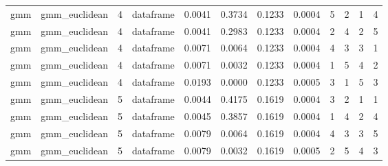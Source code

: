 {\begin{longtable}{| p{1cm} | p{1.8cm} | p{0.7cm} | p{0.9cm} | p{0.5cm} | p{0.65cm} | p{0.5cm} | p{0.5cm} | p{0.55cm} | p{0.55cm} | p{0.6cm} | p{0.5cm} |}
\cline{3-12}
\scriptsize     gmm   & \scriptsize   gmm\_euclidean & \scriptsize    4     & \scriptsize dataframe  & \scriptsize    0.0041  & \scriptsize 0.3734 &  \scriptsize 0.1233 & \scriptsize    0.0004 &   \scriptsize    5 & \scriptsize    2  & \scriptsize    1  & \scriptsize    4 \\
\scriptsize     gmm   & \scriptsize   gmm\_euclidean & \scriptsize    4     & \scriptsize dataframe & \scriptsize    0.0041 &   \scriptsize 0.2983 & \scriptsize 0.1233 & \scriptsize    0.0004 &   \scriptsize    2 & \scriptsize    4 &  \scriptsize    2 &  \scriptsize    5 \\
\scriptsize     gmm   & \scriptsize   gmm\_euclidean & \scriptsize    4     & \scriptsize dataframe & \scriptsize    0.0071  &  \scriptsize 0.0064 &  \scriptsize 0.1233 & \scriptsize    0.0004 &   \scriptsize    4 &  \scriptsize    3 &  \scriptsize    3 &  \scriptsize    1 \\
\scriptsize     gmm   & \scriptsize   gmm\_euclidean & \scriptsize    4     & \scriptsize dataframe & \scriptsize    0.0071   & \scriptsize 0.0032 &  \scriptsize 0.1233 & \scriptsize    0.0004 &   \scriptsize    1 &  \scriptsize    5  & \scriptsize    4  & \scriptsize    2 \\
\scriptsize     gmm   & \scriptsize   gmm\_euclidean & \scriptsize    4     & \scriptsize dataframe & \scriptsize    0.0193   & \scriptsize 0.0000 &  \scriptsize 0.1233 & \scriptsize    0.0005 &   \scriptsize    3 &  \scriptsize    1 &  \scriptsize    5 &  \scriptsize    3 \\
\cline{3-12}
\scriptsize     gmm   & \scriptsize   gmm\_euclidean & \scriptsize    5     & \scriptsize dataframe & \scriptsize    0.0044   & \scriptsize 0.4175 &  \scriptsize 0.1619 & \scriptsize    0.0004 &   \scriptsize    3 &  \scriptsize    2  & \scriptsize    1  & \scriptsize    1 \\
\scriptsize     gmm   & \scriptsize    gmm\_euclidean & \scriptsize    5    & \scriptsize dataframe & \scriptsize    0.0045  &  \scriptsize 0.3857 & \scriptsize 0.1619 & \scriptsize    0.0004 & \scriptsize   1  & \scriptsize    4  & \scriptsize    2  & \scriptsize    4 \\
\scriptsize     gmm   & \scriptsize    gmm\_euclidean & \scriptsize    5    & \scriptsize dataframe & \scriptsize    0.0079  &  \scriptsize 0.0064 & \scriptsize 0.1619 & \scriptsize    0.0004 & \scriptsize   4  & \scriptsize    3  & \scriptsize    3  & \scriptsize    5 \\
\scriptsize     gmm   & \scriptsize    gmm\_euclidean & \scriptsize    5    & \scriptsize dataframe & \scriptsize    0.0079  &  \scriptsize 0.0032 & \scriptsize 0.1619 & \scriptsize    0.0005 & \scriptsize   2  & \scriptsize    5  & \scriptsize    4  & \scriptsize    3 \\

\end{longtable}}
